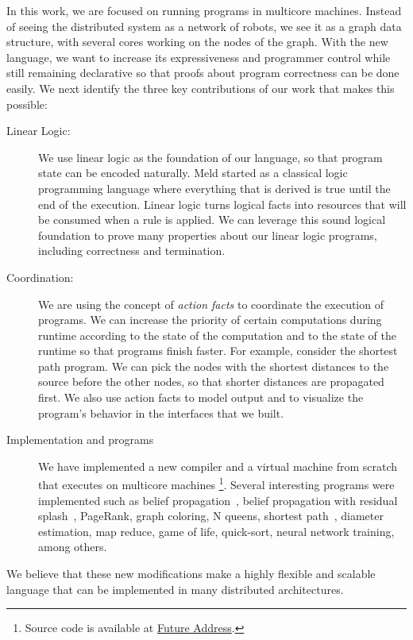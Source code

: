 In this work, we are focused on running \lang programs in multicore machines.
Instead of seeing the distributed system as a network of robots, we see it as a graph data structure,
with several cores working on the nodes of the graph. With the new language, we want to increase its expressiveness and
programmer control while still remaining declarative so that proofs about program correctness can be done easily.
We next identify the three key contributions of our work that makes this possible:

\begin{description}
   \item[Linear Logic:] We use linear logic as the foundation of our language, so that program state can be encoded naturally.
   Meld started as a classical logic programming language where everything that is derived is true until the end
   of the execution. Linear logic turns logical facts into resources that will be consumed when a rule is applied.
   We can leverage this sound logical foundation to prove many properties about our linear logic programs, including correctness and termination.
   \item[Coordination:] We are using the concept of \emph{action facts} to coordinate the execution of programs.
   We can increase the priority of certain computations during runtime according to the state
   of the computation and to the state of the runtime so that programs finish faster.
   For example, consider the shortest path program. We can pick the nodes with the shortest
   distances to the source before the other nodes, so that shorter distances are propagated first.
   We also use action facts to model output and to visualize the program's behavior in the interfaces
   that we built.
   \item[Implementation and programs] We have implemented a new compiler and a virtual machine from scratch that executes on multicore machines
   \footnote{Source code is available at \url{Future Address}.}.
   Several interesting programs were implemented such as belief propagation~\cite{Gonzalez+al:aistats09paraml},
   belief propagation with residual splash~\cite{Gonzalez+al:aistats09paraml}, PageRank, graph coloring,
   N queens, shortest path~\cite{Dijkstra}, diameter estimation, map reduce, game of life, quick-sort, neural network training, among others.
\end{description}

We believe that these new modifications make \lang a highly flexible and scalable language that can be implemented
in many distributed architectures.

